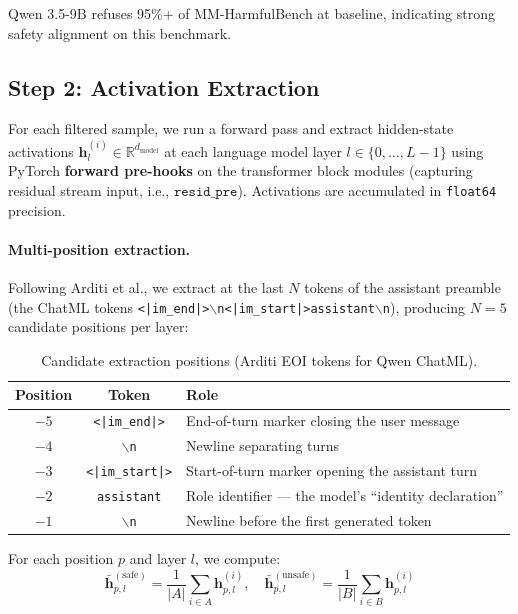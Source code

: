 \documentclass[11pt,a4paper]{article}
\begin{document}
Qwen 3.5-9B refuses 95\%+ of MM-HarmfulBench at baseline, indicating strong safety alignment on this benchmark.

\subsection{Step 2: Activation Extraction}

For each filtered sample, we run a forward pass and extract hidden-state activations $\mathbf{h}_l^{(i)} \in \mathbb{R}^{d_\text{model}}$ at each language model layer $l \in \{0, \ldots, L{-}1\}$ using PyTorch \textbf{forward pre-hooks} on the transformer block modules (capturing residual stream input, i.e., $\texttt{resid\_pre}$). Activations are accumulated in \texttt{float64} precision.

\paragraph{Multi-position extraction.} Following Arditi et al., we extract at the last $N$ tokens of the assistant preamble (the ChatML tokens \texttt{<|im\_end|>$\backslash$n<|im\_start|>assistant$\backslash$n}), producing $N=5$ candidate positions per layer:

\begin{table}[H]\centering
\caption{Candidate extraction positions (Arditi EOI tokens for Qwen ChatML).}
\begin{tabular}{ccl}
\toprule
\textbf{Position} & \textbf{Token} & \textbf{Role} \\
\midrule
$-5$ & \texttt{<|im\_end|>}   & End-of-turn marker closing the user message \\
$-4$ & \texttt{$\backslash$n} & Newline separating turns \\
$-3$ & \texttt{<|im\_start|>} & Start-of-turn marker opening the assistant turn \\
$-2$ & \texttt{assistant}     & Role identifier --- the model's ``identity declaration'' \\
$-1$ & \texttt{$\backslash$n} & Newline before the first generated token \\
\bottomrule
\end{tabular}
\end{table}

For each position $p$ and layer $l$, we compute:
\[
\bar{\mathbf{h}}_{p,l}^{(\text{safe})} = \frac{1}{|A|}\sum_{i \in A} \mathbf{h}_{p,l}^{(i)}, \quad
\bar{\mathbf{h}}_{p,l}^{(\text{unsafe})} = \frac{1}{|B|}\sum_{i \in B} \mathbf{h}_{p,l}^{(i)}
\]
\end{document}
